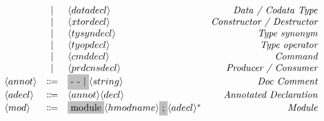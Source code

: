 \documentclass[11pt]{article}
\newcommand{\nonterminal}[1]{\langle #1 \rangle}
\newcommand{\terminal}[1]{\colorbox{lightgray}{\vphantom{X}#1}}
\begin{document}
\[\begin{array}{lclr}
    & | & \nonterminal{datadecl} & \emph{Data / Codata Type} \\
    & | & \nonterminal{xtordecl} & \emph{Constructor / Destructor} \\
    & | & \nonterminal{tysyndecl} & \emph{Type synonym} \\
    & | & \nonterminal{tyopdecl} & \emph{Type operator} \\
    & | & \nonterminal{cmddecl} & \emph{Command} \\
    & | & \nonterminal{prdcnsdecl} & \emph{Producer / Consumer} \\
    \nonterminal{annot} & \Coloneqq & \terminal{- - $|$} \nonterminal{string} & \emph{Doc Comment} \\
    \nonterminal{adecl} & \Coloneqq & \nonterminal{annot}\nonterminal{decl} & \emph{Annotated Declaration} \\
    \nonterminal{mod} & \Coloneqq & \terminal{module} \nonterminal{hmodname} \terminal{;} \nonterminal{adecl}^{\ast}& \emph{Module}
  \end{array}
\]
\end{document}
